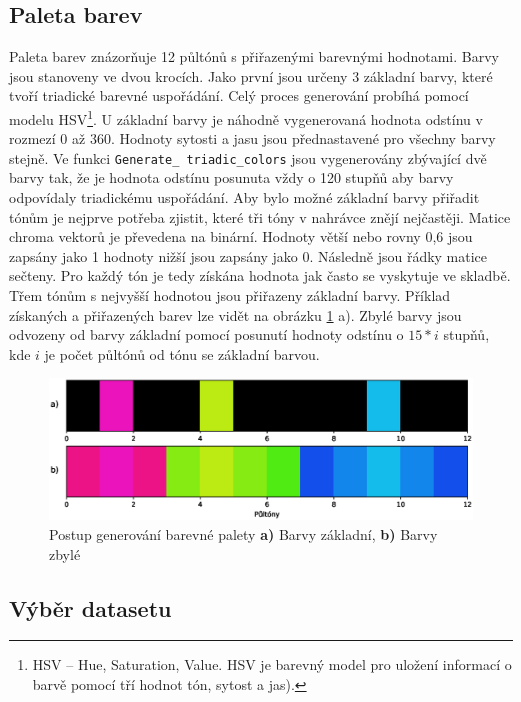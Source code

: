
\subsection{Paleta barev} \label{sec:Color_palete}

Paleta barev znázorňuje 12 půltónů s přiřazenými barevnými hodnotami. Barvy jsou stanoveny ve dvou krocích. Jako první jsou určeny 3 základní barvy, které tvoří triadické barevné uspořádání. Celý proces generování probíhá pomocí modelu \acs{HSV}\footnote{HSV -- Hue, Saturation, Value. HSV je barevný model pro uložení informací o barvě pomocí tří hodnot tón, sytost a jas).}. U základní barvy je náhodně vygenerovaná hodnota odstínu v rozmezí 0 až 360. Hodnoty sytosti a jasu jsou přednastavené pro všechny barvy stejně. Ve funkci \texttt{Generate\_ triadic\_colors} jsou vygenerovány zbývající dvě barvy tak, že je hodnota odstínu posunuta vždy o 120 stupňů aby barvy odpovídaly triadickému uspořádání. Aby bylo možné základní barvy přiřadit tónům je nejprve potřeba zjistit, které tři tóny v nahrávce znějí nejčastěji. Matice chroma vektorů je převedena na binární. Hodnoty větší nebo rovny 0,6 jsou zapsány jako 1 hodnoty nižší jsou zapsány jako 0. Následně jsou řádky matice sečteny. Pro každý tón je tedy získána hodnota jak často se vyskytuje ve skladbě. Třem tónům s nejvyšší hodnotou jsou přiřazeny základní barvy. Příklad získaných a přiřazených barev lze vidět na obrázku \ref{fig:Color_palete} a). Zbylé barvy jsou odvozeny od barvy základní pomocí posunutí hodnoty odstínu o $15*i$ stupňů, kde $i$ je počet půltónů od tónu se základní barvou.

\begin{figure}[H]
    \centering
    \includegraphics[width = 1\linewidth]{obrazky/Color_palete.eps}
    \caption{Postup generování barevné palety \textbf{a)} Barvy základní, \textbf{b)} Barvy zbylé}
    \label{fig:Color_palete}
\end{figure}

\subsection{Výběr datasetu} \label{sec:Vyber_datasetu}

